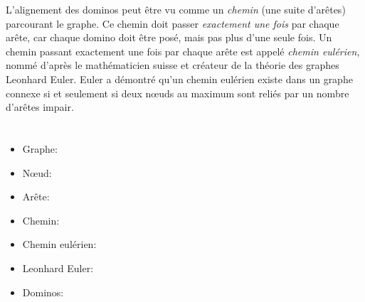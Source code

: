 {{L’alignement des dominos peut être vu comme un \emph{chemin} (une suite d’arêtes) parcourant le graphe. Ce chemin doit passer \emph{exactement une fois} par chaque arête, car chaque domino doit être posé, mais pas plus d’une seule fois. Un chemin passant exactement une fois par chaque arête est appelé \emph{chemin eulérien}, nommé d’après le mathématicien suisse et créateur de la théorie des graphes Leonhard Euler. Euler a démontré qu’un chemin eulérien existe dans un graphe connexe si et seulement si deux nœuds au maximum sont reliés par un nombre d’arêtes impair.



\section*{\BrochureWebsitesAndKeywords}
{\raggedright
\begin{itemize}
  \item Graphe: \href{https://fr.wikipedia.org/wiki/Graphe_(math\%C3\%A9matiques_discr\%C3\%A8tes)}{}
  \item Nœud: \href{https://fr.wikipedia.org/wiki/Sommet_(th\%C3\%A9orie_des_graphes)}{}
  \item Arête: \href{https://fr.wikipedia.org/wiki/Ar\%C3\%AAte_(th\%C3\%A9orie_des_graphes)}{}
  \item Chemin: \href{https://fr.wikipedia.org/wiki/Chemin_(th\%C3\%A9orie_des_graphes)}{}
  \item Chemin eulérien: \href{https://fr.wikipedia.org/wiki/Graphe_eul\%C3\%A9rien}{}
  \item Leonhard Euler: \href{https://fr.wikipedia.org/wiki/Leonhard_Euler}{}
  \item Dominos: \href{https://fr.wikipedia.org/wiki/Dominos_(jeu)}{}
\end{itemize}


}

}{}

}
